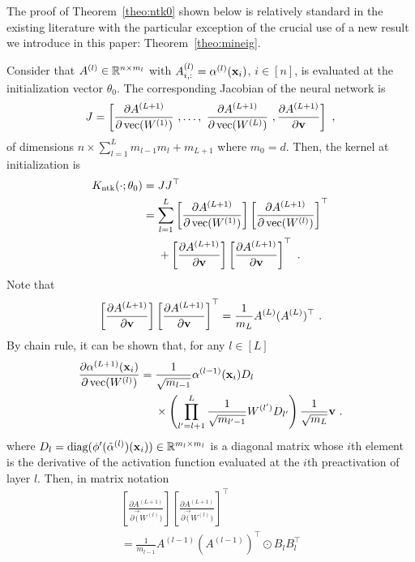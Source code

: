 The proof of Theorem~\ref{theo:ntk0} shown below is relatively standard in the existing literature with the particular exception of the crucial use of a new result we introduce in this paper: Theorem~\ref{theo:mineig}.

Consider that $A^{(l)} \in \mathbb{R}^{n \times m_{l}}$ with $A^{(l)}_{i,:} = \alpha^{(l)}(\mathbf{x}_i)$, $i\in[n]$, is evaluated at the initialization vector $\theta_0$. 
%
The corresponding Jacobian of the neural network is
\begin{align*}
J = \left[ \frac{\partial A^{(L+1)}}{\partial \operatorname{vec}(W^{(1)})}~,\ldots, ~\frac{\partial A^{(L+1)}}{\partial \operatorname{vec}(W^{(L)})}~, \frac{\partial A^{(L+1)}}{\partial \mathbf{v}} \right]~,
\end{align*}
of dimensions $n \times \sum_{l=1}^L m_{l-1} m_l + m_{L+1}$ where $m_0 =d$. Then, the kernel at initialization is
\begin{align*}
K_{\operatorname{ntk}}(\cdot ;\theta_0) &= J J^\top \\
&= \sum_{l=1}^L  \left[ \frac{\partial A^{(L+1)}}{\partial \operatorname{vec}(W^{(1)})}\right] \left[ \frac{\partial A^{(L+1)}}{\partial \operatorname{vec}(W^{(l)})}\right]^\top\\
&~~~~+\left[\frac{\partial A^{(L+1)}}{\partial \mathbf{v}} \right] \left[ \frac{\partial A^{(L+1)}}{\partial \mathbf{v}}\right]^\top~.
\end{align*}
Note that
\begin{align*}
\left[\frac{\partial A^{(L+1)}}{\partial \mathbf{v}}\right] \left[  \frac{\partial A^{(L+1)}}{\partial \mathbf{v}}\right]^\top =  \frac{1}{m_L}A^{(L)} (A^{(L)})^\top~.
\end{align*}
By chain rule, it can be shown that, for any $l \in [L]$
\begin{align*}
\frac{\partial \alpha^{(L+1)}(\mathbf{x}_i)}{\partial \operatorname{vec}(W^{(l)})} &= \frac{1}{\sqrt{m_{l-1}}} \alpha^{(l-1)}(\mathbf{x}_i) D_l\\
&~~~~\times\left( \prod_{l'=l+1}^L \frac{1}{\sqrt{m_{l'-1}}}  W^{(l')} D_{l'} \right)\frac{1}{\sqrt{m_L}} \mathbf{v} ~. 
\end{align*}
where $D_l = \text{diag}(\phi'(\tilde{\alpha}^{(l)})(\mathbf{x}_i)) \in \mathbb{R}^{m_l \times m_l}$ is a diagonal matrix whose $i$th element is the derivative of the activation function evaluated at the $i$th preactivation of layer $l$. Then, in matrix notation
\begin{multline*}
\left[ \frac{\partial A^{(L+1)}}{\partial \vec(W^{(l)})} \right] \left[ \frac{\partial A^{(L+1)}}{\partial \vec(W^{(l)})} \right]^\top\\ 
= \frac{1}{m_{l-1}} A^{(l-1)} (A^{(l-1)})^\top \odot B_l B_l^\top 
\end{multline*}
